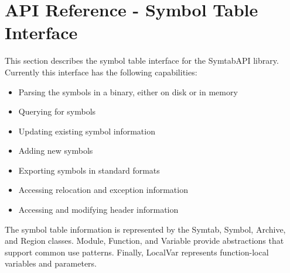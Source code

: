 \section{API Reference - Symbol Table Interface}
\label{sec:symtabAPI}

This section describes the symbol table interface for the SymtabAPI library. Currently this interface has the following capabilities:
\begin{itemize}
    \item Parsing the symbols in a binary, either on disk or in memory
    \item Querying for symbols
    \item Updating existing symbol information
    \item Adding new symbols
    \item Exporting symbols in standard formats
    \item Accessing relocation and exception information
    \item Accessing and modifying header information
\end{itemize}

The symbol table information is represented by the Symtab, Symbol, Archive, and Region classes. Module, Function, and Variable provide abstractions that support common use patterns. Finally, LocalVar represents function-local variables and parameters.













